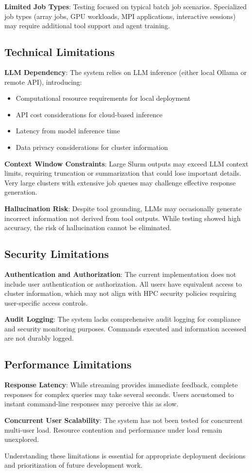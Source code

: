 \textbf{Limited Job Types}: Testing focused on typical batch job scenarios. Specialized job types (array jobs, GPU workloads, MPI applications, interactive sessions) may require additional tool support and agent training.

\subsection{Technical Limitations}

\textbf{LLM Dependency}: The system relies on LLM inference (either local Ollama or remote API), introducing:
\begin{itemize}
    \item Computational resource requirements for local deployment
    \item API cost considerations for cloud-based inference
    \item Latency from model inference time
    \item Data privacy considerations for cluster information
\end{itemize}

\textbf{Context Window Constraints}: Large Slurm outputs may exceed LLM context limits, requiring truncation or summarization that could lose important details. Very large clusters with extensive job queues may challenge effective response generation.

\textbf{Hallucination Risk}: Despite tool grounding, LLMs may occasionally generate incorrect information not derived from tool outputs. While testing showed high accuracy, the risk of hallucination cannot be eliminated.

\subsection{Security Limitations}

\textbf{Authentication and Authorization}: The current implementation does not include user authentication or authorization. All users have equivalent access to cluster information, which may not align with HPC security policies requiring user-specific access controls.

\textbf{Audit Logging}: The system lacks comprehensive audit logging for compliance and security monitoring purposes. Commands executed and information accessed are not durably logged.

\subsection{Performance Limitations}

\textbf{Response Latency}: While streaming provides immediate feedback, complete responses for complex queries may take several seconds. Users accustomed to instant command-line responses may perceive this as slow.

\textbf{Concurrent User Scalability}: The system has not been tested for concurrent multi-user load. Resource contention and performance under load remain unexplored.

Understanding these limitations is essential for appropriate deployment decisions and prioritization of future development work.
